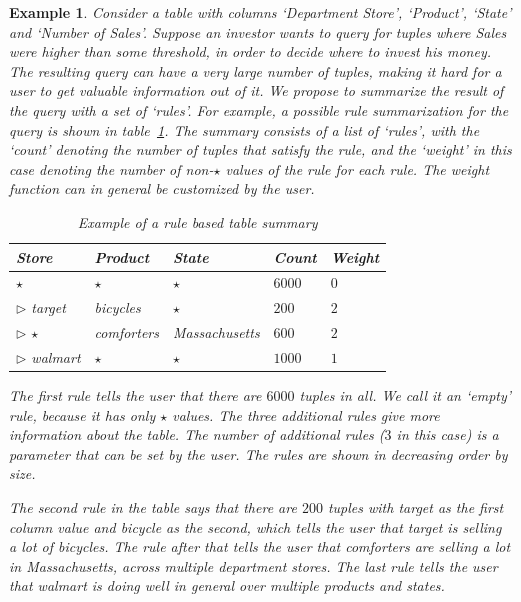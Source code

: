 \documentclass{sig-alternate}
\newtheorem{example}[definition]{Example}
\begin{document}
\begin{example}\label{ex:introexample}
Consider a table with columns `Department Store', `Product', `State' and `Number of Sales'. Suppose an investor wants to query for tuples where Sales were higher than some threshold, in order to decide where to invest his money. The resulting query can have a very large number of tuples, making it hard for a user to get valuable information out of it. We propose to summarize the result of the query with a set of `rules'. For example, a possible rule summarization for the query is shown in table~\ref{table:introexample}. The summary consists of a list of `rules', with the `count' denoting the number of tuples that satisfy the rule, and the `weight' in this case denoting the number of non-$\star$ values of the rule for each rule. The weight function can in general be customized by the user.

\begin{table}
\centering
\begin{tabular}{| l | l | l | l | l |}
\hline Store & Product & State & Count & Weight \\
\hline
$\star$ & $\star$ & $\star$ & $6000$ & $0$ \\ \hline
$\triangleright$ target & bicycles & $\star$ & $200$ & $2$ \\ \hline
$\triangleright$ $\star$ & comforters & Massachusetts & $600$ & $2$ \\ \hline
$\triangleright$ walmart & $\star$ & $\star$ & $1000$ & $1$ \\ \hline
\end{tabular}
\caption{Example of a rule based table summary \label{table:introexample}}
\end{table}


The first rule tells the user that there are $6000$ tuples in all. We call it an `empty' rule, because it has only $\star$ values. The three additional rules give more information about the table. The number of additional rules ($3$ in this case) is a parameter that can be set by the user. The rules are shown in decreasing order by size. 

The second rule in the table says that there are $200$ tuples with target as the first column value and bicycle as the second, which tells the user that target is selling a lot of bicycles. The rule after that tells the user that comforters are selling a lot in Massachusetts, across multiple department stores. The last rule tells the user that walmart is doing well in general over multiple products and states. 


\end{example}
\end{document}
